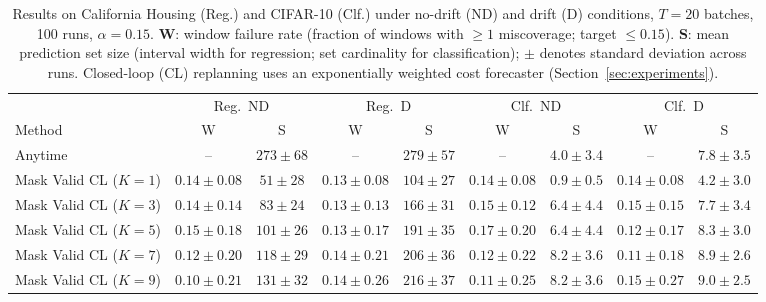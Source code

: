 \documentclass{uai2026} %
\newcommand{\1}{\mathbf{1}}
\begin{document}
\begin{table}[htbp]
  \centering
  \caption{%
    Results on California Housing (Reg.) and CIFAR-10 (Clf.) under no-drift (ND) and drift (D) conditions, $T = 20$ batches, 100 runs, $\alpha = 0.15$.
    \textbf{W}: window failure rate (fraction of windows with $\ge 1$ miscoverage; target $\le 0.15$).
    \textbf{S}: mean prediction set size (interval width for regression; set cardinality for classification); $\pm$ denotes standard deviation across runs.
    Closed-loop (CL) replanning uses an exponentially weighted cost forecaster (Section~\ref{sec:experiments}).
  }
  \label{tab:results}
  \small
  \begin{tabular}{@{}l|cc|cc|cc|cc@{}}
    \toprule
    & \multicolumn{2}{c|}{Reg.\ ND}
    & \multicolumn{2}{c|}{Reg.\ D}
    & \multicolumn{2}{c|}{Clf.\ ND}
    & \multicolumn{2}{c}{Clf.\ D}                                                                                                                       \\
    \cmidrule(lr){2-3}\cmidrule(lr){4-5}\cmidrule(lr){6-7}\cmidrule(lr){8-9}
    Method                        & W                             & S            & W               & S            & W               & S             & W               & S             \\
    \midrule
    Anytime                       & --                            & $273{\pm}68$ & --              & $279{\pm}57$ & --              & $4.0{\pm}3.4$ & --              & $7.8{\pm}3.5$ \\
    Mask Valid CL ($K{=}1$) & $0.14{\pm}0.08$               & $51{\pm}28$  & $0.13{\pm}0.08$ & $104{\pm}27$ & $0.14{\pm}0.08$ & $0.9{\pm}0.5$ & $0.14{\pm}0.08$ & $4.2{\pm}3.0$ \\
    Mask Valid CL ($K{=}3$) & $0.14{\pm}0.14$               & $83{\pm}24$  & $0.13{\pm}0.13$ & $166{\pm}31$ & $0.15{\pm}0.12$ & $6.4{\pm}4.4$ & $0.15{\pm}0.15$ & $7.7{\pm}3.4$ \\
    Mask Valid CL ($K{=}5$) & $0.15{\pm}0.18$               & $101{\pm}26$ & $0.13{\pm}0.17$ & $191{\pm}35$ & $0.17{\pm}0.20$ & $6.4{\pm}4.4$ & $0.12{\pm}0.17$ & $8.3{\pm}3.0$ \\
    Mask Valid CL ($K{=}7$) & $0.12{\pm}0.20$               & $118{\pm}29$ & $0.14{\pm}0.21$ & $206{\pm}36$ & $0.12{\pm}0.22$ & $8.2{\pm}3.6$ & $0.11{\pm}0.18$ & $8.9{\pm}2.6$ \\
    Mask Valid CL ($K{=}9$) & $0.10{\pm}0.21$               & $131{\pm}32$ & $0.14{\pm}0.26$ & $216{\pm}37$ & $0.11{\pm}0.25$ & $8.2{\pm}3.6$ & $0.15{\pm}0.27$ & $9.0{\pm}2.5$ \\
    \bottomrule
  \end{tabular}
\end{table}
\end{document}
